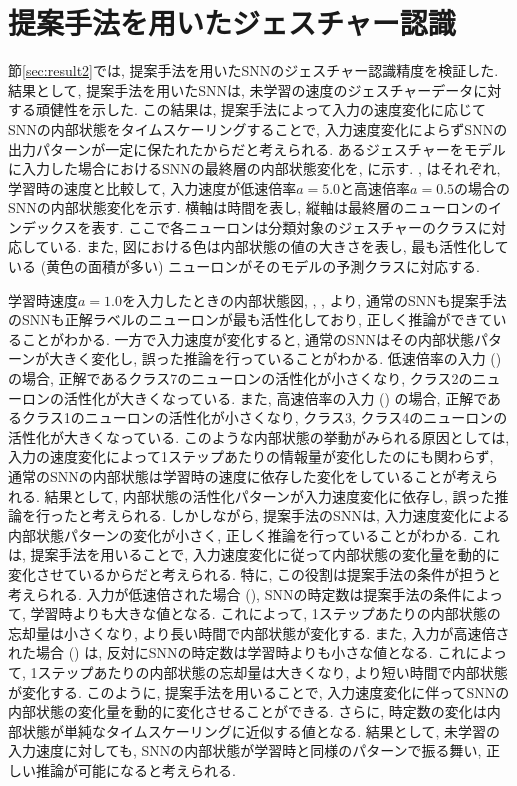 \section{提案手法を用いたジェスチャー認識}
節\ref{sec:result2}では, 提案手法を用いたSNNのジェスチャー認識精度を検証した.
結果として, 提案手法を用いたSNNは, 未学習の速度のジェスチャーデータに対する頑健性を示した.
この結果は, 提案手法によって入力の速度変化に応じてSNNの内部状態をタイムスケーリングすることで, 入力速度変化によらずSNNの出力パターンが一定に保たれたからだと考えられる.
あるジェスチャーをモデルに入力した場合におけるSNNの最終層の内部状態変化を, に示す.
, はそれぞれ, 学習時の速度と比較して, 入力速度が低速倍率$a=5.0$と高速倍率$a=0.5$の場合のSNNの内部状態変化を示す.
横軸は時間を表し, 縦軸は最終層のニューロンのインデックスを表す.
ここで各ニューロンは分類対象のジェスチャーのクラスに対応している.
また, 図における色は内部状態の値の大きさを表し, 最も活性化している (黄色の面積が多い) ニューロンがそのモデルの予測クラスに対応する.

学習時速度$a=1.0$を入力したときの内部状態図, , , より, 通常のSNNも提案手法のSNNも正解ラベルのニューロンが最も活性化しており, 正しく推論ができていることがわかる.
一方で入力速度が変化すると, 通常のSNNはその内部状態パターンが大きく変化し, 誤った推論を行っていることがわかる.
低速倍率の入力 () の場合, 正解であるクラス7のニューロンの活性化が小さくなり, クラス2のニューロンの活性化が大きくなっている.
また, 高速倍率の入力 () の場合, 正解であるクラス1のニューロンの活性化が小さくなり, クラス3, クラス4のニューロンの活性化が大きくなっている.
このような内部状態の挙動がみられる原因としては, 入力の速度変化によって1ステップあたりの情報量が変化したのにも関わらず, 通常のSNNの内部状態は学習時の速度に依存した変化をしていることが考えられる.
結果として, 内部状態の活性化パターンが入力速度変化に依存し, 誤った推論を行ったと考えられる.
しかしながら, 提案手法のSNNは, 入力速度変化による内部状態パターンの変化が小さく, 正しく推論を行っていることがわかる.
これは, 提案手法を用いることで, 入力速度変化に従って内部状態の変化量を動的に変化させているからだと考えられる.
特に, この役割は提案手法の条件が担うと考えられる.
入力が低速倍された場合 (), SNNの時定数は提案手法の条件によって, 学習時よりも大きな値となる.
これによって, 1ステップあたりの内部状態の忘却量は小さくなり, より長い時間で内部状態が変化する.
また, 入力が高速倍された場合 () は, 反対にSNNの時定数は学習時よりも小さな値となる.
これによって, 1ステップあたりの内部状態の忘却量は大きくなり, より短い時間で内部状態が変化する.
このように, 提案手法を用いることで, 入力速度変化に伴ってSNNの内部状態の変化量を動的に変化させることができる.
さらに, 時定数の変化は内部状態が単純なタイムスケーリングに近似する値となる.
結果として, 未学習の入力速度に対しても, SNNの内部状態が学習時と同様のパターンで振る舞い, 正しい推論が可能になると考えられる.

